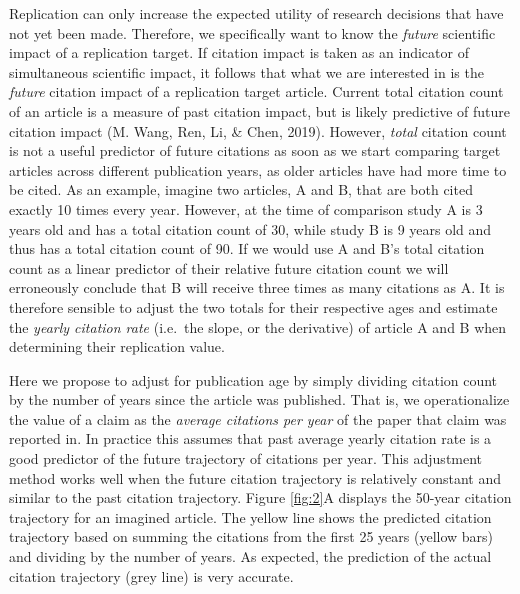 \documentclass[
  english,
  jou,floatsintext]{apa6}
\begin{document}
Replication can only increase the expected utility of research decisions that have not yet been made. Therefore, we specifically want to know the \emph{future} scientific impact of a replication target. If citation impact is taken as an indicator of simultaneous scientific impact, it follows that what we are interested in is the \emph{future} citation impact of a replication target article. Current total citation count of an article is a measure of past citation impact, but is likely predictive of future citation impact (M. Wang, Ren, Li, \& Chen, 2019). However, \emph{total} citation count is not a useful predictor of future citations as soon as we start comparing target articles across different publication years, as older articles have had more time to be cited. As an example, imagine two articles, A and B, that are both cited exactly 10 times every year. However, at the time of comparison study A is 3 years old and has a total citation count of 30, while study B is 9 years old and thus has a total citation count of 90. If we would use A and B's total citation count as a linear predictor of their relative future citation count we will erroneously conclude that B will receive three times as many citations as A. It is therefore sensible to adjust the two totals for their respective ages and estimate the \emph{yearly citation rate} (i.e.~the slope, or the derivative) of article A and B when determining their replication value.

Here we propose to adjust for publication age by simply dividing citation count by the number of years since the article was published. That is, we operationalize the value of a claim as the \emph{average citations per year} of the paper that claim was reported in. In practice this assumes that past average yearly citation rate is a good predictor of the future trajectory of citations per year. This adjustment method works well when the future citation trajectory is relatively constant and similar to the past citation trajectory. Figure \ref{fig:2}A displays the 50-year citation trajectory for an imagined article. The yellow line shows the predicted citation trajectory based on summing the citations from the first 25 years (yellow bars) and dividing by the number of years. As expected, the prediction of the actual citation trajectory (grey line) is very accurate.
\end{document}
